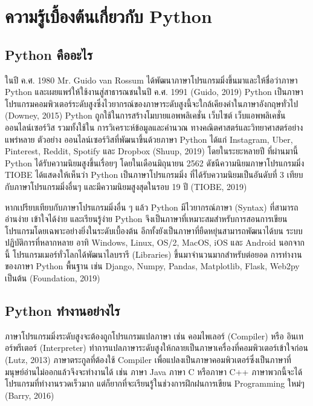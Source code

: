\chapter{ความรู้เบื้องต้นเกี่ยวกับ Python}

\section{Python คืออะไร}

ในปี ค.ศ. 1980 Mr. Guido van Rossum ได้พัฒนาภาษาโปรแกรมมิ่งขึ้นมาและให้ชื่อว่าภาษา Python และเผยแพร่ให้ใช้งานสู่สาธารณชนในปี ค.ศ. 1991 (Guido, 2019) Python เป็นภาษาโปรแกรมคอมพิวเตอร์ระดับสูงซึ่งไวยากรณ์ของภาษาระดับสูงนี้จะใกล้เคียงคำในภาษาอังกฤษทั่วไป (Downey, 2015) Python ถูกใช้ในการสร้างโมบายแอพพลิเคชั่น เว็บไซต์ เว็บแอพพลิเคชั่น ออนไลน์เซอร์วิส รวมทั้งใช้ใน การวิเคราะห์ข้อมูลและคำนวณ ทางคณิตศาสตร์และวิทยาศาสตร์อย่างแพร่หลาย  ตัวอย่าง ออนไลน์เซอร์วิสที่พัฒนาขึ้นด้วยภาษา Python ได้แก่ Instagram, Uber, Pinterest, Reddit, Spotify และ Dropbox (Shuup, 2019) โดยในระยะหลายปี ที่ผ่านมานี้ Python ได้รับความนิยมสูงขึ้นเรื่อยๆ โดยในเดือนมิถุนายน 2562 ดัชนีความนิยมภาษาโปรแกรมมิ่ง TIOBE ได้แสดงให้เห็นว่า Python เป็นภาษาโปรแกรมมิ่ง ที่ได้รับความนิยมเป็นอันดับที่ 3 เทียบกับภาษาโปรแกรมมิ่งอื่นๆ และมีความนิยมสูงสุดในรอบ 19 ปี (TIOBE, 2019)

หากเปรียบเทียบกับภาษาโปรแกรมมิ่งอื่น ๆ แล้ว Python มีไวยากรณ์ภาษา (Syntax) ที่สามารถอ่านง่าย เข้าใจได้ง่าย และเรียนรู้ง่าย Python จึงเป็นภาษาที่เหมาะสมสำหรับการสอนการเขียนโปรแกรมโดยเฉพาะอย่างยิ่งในระดับเบื้องต้น อีกทั้งยังเป็นภาษาที่ยืดหยุ่นสามารถพัฒนาได้บน ระบบปฏิบัติการที่หลากหลาย อาทิ  Windows, Linux, OS/2, MacOS, iOS และ Android นอกจากนี้ โปรแกรมเมอร์ทั่วโลกได้พัฒนาไลบรารี (Libraries) ขึ้นมาจำนวนมากสำหรับต่อยอด การทำงานของภาษา Python พื้นฐาน เช่น Django, Numpy, Pandas, Matplotlib, Flask, Web2py เป็นต้น (Foundation, 2019)

\section{Python ทำงานอย่างไร}

ภาษาโปรแกรมมิ่งระดับสูงจะต้องถูกโปรแกรมแปลภาษา เช่น คอมไพเลอร์ (Compiler) หรือ อินเทอร์พรีเตอร์ (Interpreter) ทำการแปลภาษาระดับสูงให้กลายเป็นภาษาเครื่องที่คอมพิวเตอร์เข้าใจก่อน (Lutz, 2013) ภาษาตระกูลที่ต้องใช้ Compiler เพื่อแปลงเป็นภาษาคอมพิวเตอร์ซึ่งเป็นภาษาที่มนุษย์อ่านไม่ออกแล้วจึงจะทำงานได้ เช่น ภาษา Java ภาษา C หรือภาษา C++ ภาษาพวกนี้จะได้โปรแกรมที่ทำงานรวดเร็วมาก แต่ก็ยากที่จะเรียนรู้ในช่วงการฝึกฝนการเขียน Programming ใหม่ๆ (Barry, 2016)

